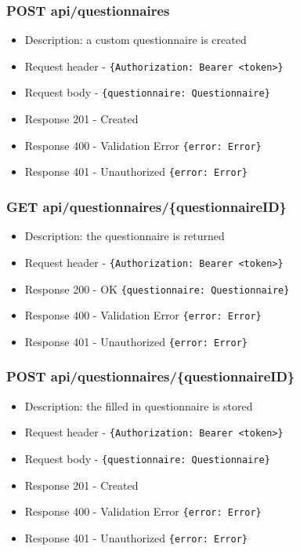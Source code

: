 \subsubsection{POST api/questionnaires}
\begin{itemize}
    \item Description: a custom questionnaire is created
    \item Request header - \verb|{Authorization: Bearer <token>}|
    \item Request body - \verb|{questionnaire: Questionnaire}|
    \item Response 201 - Created
    \item Response 400 - Validation Error \verb|{error: Error}|
    \item Response 401 - Unauthorized \verb|{error: Error}|
\end{itemize}

\subsubsection{GET api/questionnaires/\{questionnaireID\}}
\begin{itemize}
    \item Description: the questionnaire is returned
    \item Request header - \verb|{Authorization: Bearer <token>}|
    \item Response 200 - OK \verb|{questionnaire: Questionnaire}|
    \item Response 400 - Validation Error \verb|{error: Error}|
    \item Response 401 - Unauthorized \verb|{error: Error}|
\end{itemize}

\subsubsection{POST api/questionnaires/\{questionnaireID\}}
\begin{itemize}
    \item Description: the filled in questionnaire is stored
    \item Request header - \verb|{Authorization: Bearer <token>}|
    \item Request body - \verb|{questionnaire: Questionnaire}|
    \item Response 201 - Created
    \item Response 400 - Validation Error \verb|{error: Error}|
    \item Response 401 - Unauthorized \verb|{error: Error}|
\end{itemize}

